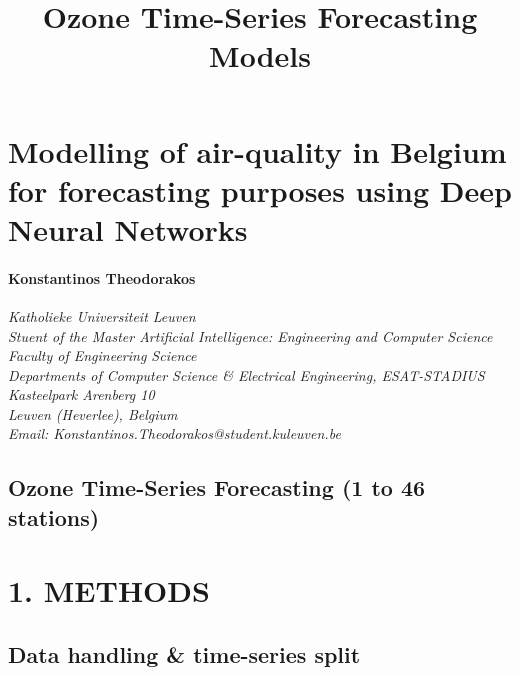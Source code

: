 \documentclass[11pt]{article}
\title{Ozone Time-Series Forecasting Models}
\begin{document}
    
    
    \maketitle
    
    

    
    \hypertarget{modelling-of-air-quality-in-belgium-for-forecasting-purposes-using-deep-neural-networks}{%
\section{Modelling of air-quality in Belgium for forecasting purposes
using Deep Neural
Networks}\label{modelling-of-air-quality-in-belgium-for-forecasting-purposes-using-deep-neural-networks}}

\hypertarget{konstantinos-theodorakos}{%
\paragraph{Konstantinos Theodorakos}\label{konstantinos-theodorakos}}

\emph{Katholieke Universiteit Leuven}\\
\emph{Stuent of the Master Artificial Intelligence: Engineering and
Computer Science}\\
\emph{Faculty of Engineering Science}\\
\emph{Departments of Computer Science \& Electrical Engineering,
ESAT-STADIUS}\\
\emph{Kasteelpark Arenberg 10}\\
\emph{Leuven (Heverlee), Belgium}\\
\emph{Email: Konstantinos.Theodorakos@student.kuleuven.be}

\hypertarget{ozone-time-series-forecasting-1-to-46-stations}{%
\subsection{Ozone Time-Series Forecasting (1 to 46
stations)}\label{ozone-time-series-forecasting-1-to-46-stations}}

    \hypertarget{methods}{%
\section{1. METHODS}\label{methods}}

\hypertarget{data-handling-time-series-split}{%
\subsection{Data handling \& time-series
split}\label{data-handling-time-series-split}}
\end{document}
